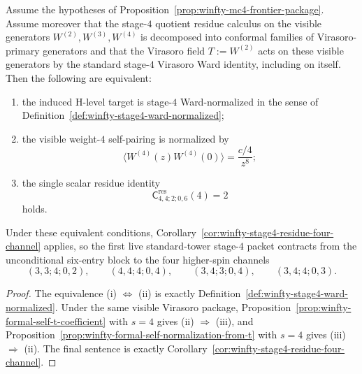 \begin{corollary}
\label{cor:winfty-stage4-single-scalar-equivalent}
Assume the hypotheses of
Proposition~\ref{prop:winfty-mc4-frontier-package}.  Assume moreover
that the stage-$4$ quotient residue calculus on the visible generators
$W^{(2)},W^{(3)},W^{(4)}$ is decomposed into conformal families of
Virasoro-primary generators and that the Virasoro field $T:=W^{(2)}$
acts on these visible generators by the standard stage-$4$ Virasoro
Ward identity, including on itself.  Then the following are
equivalent:
\begin{enumerate}[label=\textup{(\roman*)}]
\item the induced H-level target is stage-$4$ Ward-normalized in the
  sense of Definition~\ref{def:winfty-stage4-ward-normalized};
\item the visible weight-$4$ self-pairing is normalized by
  \[
  \langle W^{(4)}(z)W^{(4)}(0)\rangle = \frac{c/4}{z^{8}};
  \]
\item the single scalar residue identity
  \[
  \mathsf{C}^{\mathrm{res}}_{4,4;2;0,6}(4)=2
  \]
  holds.
\end{enumerate}
Under these equivalent conditions,
Corollary~\ref{cor:winfty-stage4-residue-four-channel} applies, so the
first live standard-tower stage-$4$ packet contracts from the
unconditional six-entry block to the four higher-spin channels
\[
(3,3;4;0,2),\qquad
(4,4;4;0,4),\qquad
(3,4;3;0,4),\qquad
(3,4;4;0,3).
\]
\end{corollary}

\begin{proof}
The equivalence \textup{(i)} \(\Longleftrightarrow\) \textup{(ii)} is
exactly Definition~\ref{def:winfty-stage4-ward-normalized}.  Under the
same visible Virasoro package,
Proposition~\ref{prop:winfty-formal-self-t-coefficient} with $s=4$
gives \textup{(ii)} \(\Longrightarrow\) \textup{(iii)}, and
Proposition~\ref{prop:winfty-formal-self-normalization-from-t} with
$s=4$ gives \textup{(iii)} \(\Longrightarrow\) \textup{(ii)}.
The final sentence is exactly
Corollary~\ref{cor:winfty-stage4-residue-four-channel}.
\end{proof}

